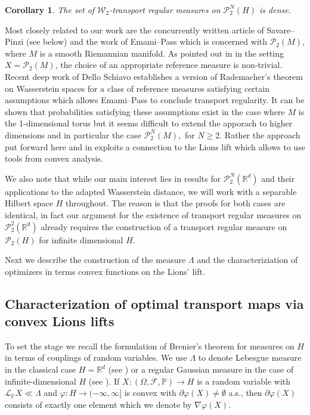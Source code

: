 \documentclass[a4paper]{amsart}
\numberwithin{theorem}{section}
\newtheorem{corollary}[theorem]{Corollary}
\theoremstyle{definition}
\newcommand{\R}{\mathbb{R}}
\newcommand{\F}{\mathcal{F}}
\newcommand{\law}{\mathcal{L}}
\newcommand{\W}{\mathcal{W}}
\newcommand{\Pc}{\mathcal P}
\renewcommand{\P}{\mathbb{P}}
\renewcommand{\phi}{\varphi}
\begin{document}
\begin{corollary}\label{cor:MainMongeIntro}
     The set of $\W_2$-transport regular measures on $\Pc_2^N(H)$ is dense. 
\end{corollary}


Most closely related to our work are the concurrently written article of Savare--Pinzi \cite{PiSa25} (see  below) and the work of Emami--Pass \cite{EmPa25} which is concerned with $\Pc_2(M)$, where $M$ is a smooth Riemannian manifold. As pointed out in \cite{EmPa25} in the setting $X = \Pc_2(M)$, the choice of an appropriate reference measure is non-trivial. Recent deep work of Dello Schiavo \cite{De20} establishes a version of Rademacher’s theorem on Wasserstein spaces for a class of
reference measures satisfying certain assumptions which allows Emami--Pass to conclude transport regularity. It can be shown that probabilities satisfying these assumptions exist in the case where $M$ is the 1-dimensional torus but it seems difficult to extend the apporach to higher dimensions and in particular the case $\Pc_2^N(M),$ for $N\geq 2$. Rather the approach put forward here and in \cite{PiSa25} exploits a connection to the Lions lift which allows to use tools from convex analysis. 

We also note that while our main interest lies in results for $\Pc_2^N(\R^d)$ and their applications to the adapted Wasserstein distance, we will work with a separable Hilbert space $H$ throughout. The reason is that the proofs for both cases are identical, in fact our argument for the existence of transport regular measures on $\Pc_2^2(\R^d)$ already requires the construction of a transport regular measure on $\Pc_2(H)$ for infinite dimensional $H$.

Next we describe the construction of the measure $\Lambda$ and the characteriziation of optimizers in terms convex functions on the Lions' lift. 




\subsection{Characterization of optimal transport maps via convex Lions lifts}\label{sec:BrenierAndLiftsIntro}

To set the stage we recall the formulation of Brenier's theorem for measures on $H$ in terms of couplings of random variables. 
We use  $\Lambda$ to denote  Lebesgue measure in the classical case $H=\R^d$ (see \cite{Br91}) or a regular Gaussian measure in the case of infinite-dimensional $H$ (see  \cite{AmGiSa08}). 
If $X:(\Omega, \F, \P)\to H$ is a random variable with $\law_\P X\ll \Lambda$ and $\phi: H\to (-\infty, \infty]$ is convex with  $\partial \phi(X) \neq \emptyset$ a.s., then  $\partial \phi(X)$ consists of exactly one element which we denote by $\nabla \phi(X)$.
\end{document}
